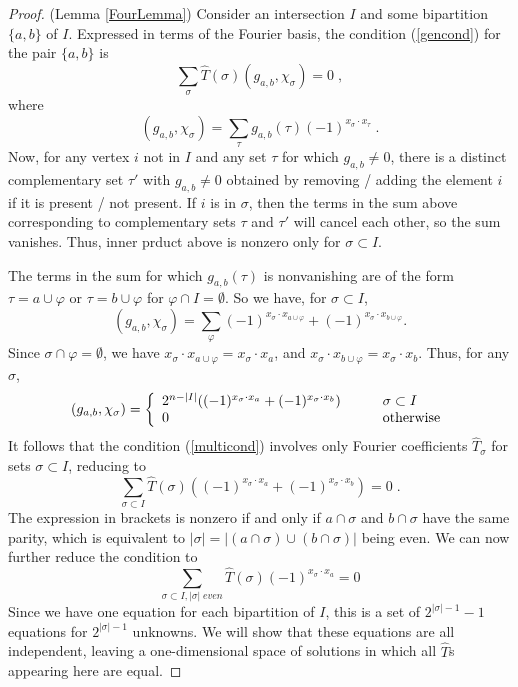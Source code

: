 \documentclass[12pt]{article}
\theoremstyle{definition}
\begin{document}
\begin{proof} (Lemma \ref{FourLemma})
Consider an intersection $I$ and some bipartition $\{a,b\}$ of $I$.
Expressed in terms of the Fourier basis, the condition (\ref{gencond}) for the pair $\{a,b\}$ is
\begin{equation}
\label{multicond}
\sum_\sigma \hat{T}(\sigma) (g_{a,b}, \chi_\sigma) = 0 \; ,
\end{equation}
where
\[
(g_{a,b}, \chi_\sigma) = \sum_\tau g_{a,b}(\tau)  (-1)^{x_\sigma \cdot x_\tau} \; .
\]
Now, for any vertex $i$ not in $I$ and any set $\tau$ for which $g_{a,b} \ne 0$, there is a distinct complementary set $\tau'$ with $g_{a,b} \ne 0$ obtained by removing / adding the element $i$ if it is present / not present. If $i$ is in $\sigma$, then the terms in the sum above corresponding to complementary sets $\tau$ and $\tau'$ will cancel each other, so the sum vanishes. Thus, inner prduct above is nonzero only for $\sigma \subset I$. 

The terms in the sum for which $g_{a,b}(\tau)$ is nonvanishing are of the form $\tau = a \cup \varphi$ or $\tau = b \cup \varphi$ for $\varphi \cap I = \emptyset$. So we have, for $\sigma \subset I$,
\[
(g_{a,b}, \chi_\sigma) = \sum_\varphi (-1)^{x_\sigma \cdot x_{a \cup \varphi}} + (-1)^{x_\sigma \cdot x_{b \cup \varphi}} .
\]
Since $\sigma \cap \varphi = \emptyset$, we have $x_\sigma \cdot x_{a \cup \varphi} = x_\sigma \cdot x_{a}$, and $x_\sigma \cdot x_{b \cup \varphi} = x_\sigma \cdot x_{b}$. Thus, for any $\sigma$,
\[
(g_{a,b}, \chi_\sigma) =  \left\{ \begin{array}{ll} 2^{n-|I|} ((-1)^{x_\sigma \cdot x_a} + (-1)^{x_\sigma \cdot x_b}) &  \qquad \sigma \subset I \cr
0 & \qquad {\rm otherwise} \end{array}  \right.
\]
It follows that the condition (\ref{multicond}) involves only Fourier coefficients $\hat{T}_\sigma$ for sets $\sigma \subset I$, reducing to 
\begin{equation}
\label{multicond2}
\sum_{\sigma \subset I} \hat{T}(\sigma) ((-1)^{x_\sigma \cdot x_a} + (-1)^{x_\sigma \cdot x_b}) = 0 \; .
\end{equation}
The expression in brackets is nonzero if and only if $a \cap \sigma$ and $b \cap \sigma$ have the same parity, which is equivalent to $|\sigma| = |(a \cap \sigma) \cup (b \cap \sigma)|$ being even. We can now further reduce the condition to
\[
\sum_{\sigma \subset I, |\sigma| \; even}  \hat{T}(\sigma) (-1)^{x_\sigma \cdot x_a} = 0
\]
Since we have one equation for each bipartition of $I$, this is a set of $2^{|\sigma|-1}-1$ equations for $2^{|\sigma|-1}$ unknowns. We will show that these equations are all independent, leaving a one-dimensional space of solutions in which all $\hat{T}$s appearing here are equal. 


\end{proof}
\end{document}

